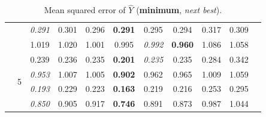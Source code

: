 \documentclass[authoryear, review, 11pt]{elsarticle}
\begin{document}
\begin{table}
\begin{center}
{\begin{tabular}{ccccccccccc}
   &  & \emph{0.291} & 0.301 & 0.296 & \textbf{0.291} & 0.295 & 0.294 & 0.317 & 0.309 \\ 
   &  & 1.019 & 1.020 & 1.001 & 0.995 & \emph{0.992} & \textbf{0.960} & 1.086 & 1.058 \\ 
  \cline{3-10}
   & \multirow{4}{*}{5} & 0.239 & 0.236 & 0.235 & \textbf{0.201} & \emph{0.235} & 0.235 & 0.284 & 0.342 \\ 
   &  & \emph{0.953} & 1.007 & 1.005 & \textbf{0.902} & 0.962 & 0.965 & 1.009 & 1.059 \\ 
   &  & \emph{0.193} & 0.229 & 0.223 & \textbf{0.163} & 0.219 & 0.216 & 0.253 & 0.295 \\ 
   &  & \emph{0.850} & 0.905 & 0.917 & \textbf{0.746} & 0.891 & 0.873 & 0.987 & 1.044 \\ 
  \end{tabular}}
\caption{Mean squared error of $\hat{Y}$ (\textbf{minimum}, \emph{next best}).\label{table:Y-mse}}
\end{center}
\end{table}

	
\end{document}
